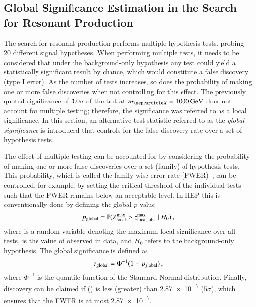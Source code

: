 
\subsection{Global Significance Estimation in the Search for Resonant \HH
  Production}%
\label{sec:global_significance}

The search for resonant \HH production performs multiple hypothesis tests,
probing 20 different signal hypotheses. When performing multiple tests, it needs
to be considered that under the background-only hypothesis any test could yield
a statistically significant result by chance, which would constitute a false
discovery (type I error). As the number of tests increases, so does the
probability of making one or more false discoveries when not controlling for
this effect. The previously quoted significance of $3.0\sigma$ of the test at
$\mX = \SI{1000}{\GeV}$ does not account for multiple testing; therefore, the
significance was referred to as a local significance. In this section, an
alternative test statistic referred to as the \emph{global significance} is
introduced that controls for the false discovery rate over a set of hypothesis
tests.

The effect of multiple testing can be accounted for by considering the
probability of making one or more false discoveries over a set (family) of
hypothesis tests. This probability, which is called the family-wise error rate
(FWER)~\cite{lehmann2005testing}, can be controlled, for example, by setting the
critical threshold of the individual tests such that the FWER remains below an
acceptable level. In HEP this is conventionally done by defining the global
$p$-value
\begin{align*}
  p_{\text{global}} = \mathbb{P}( Z_{\text{local}}^{\text{max}} > z_{\text{local, obs}}^{\text{max}} \mid H_0 )\,\text{,}
\end{align*}
where \Zmaxlocal is a random variable denoting the maximum local significance
over all tests, \zmaxlocalobs is the value of \Zmaxlocal observed in data, and
$H_0$ refers to the background-only hypothesis. The global significance is
defined as
\begin{align*}
  z_{\text{global}} = \Phi^{-1}(1 - p_{\text{global}}) \,\text{,}
\end{align*}
where $\Phi^{-1}$ is the quantile function of the Standard Normal
distribution. Finally, discovery can be claimed if \pglobal (\zglobal) is less
(greater) than \num{2.87e-7} ($5\sigma$), which ensures that the FWER is at most
\num{2.87e-7}.

